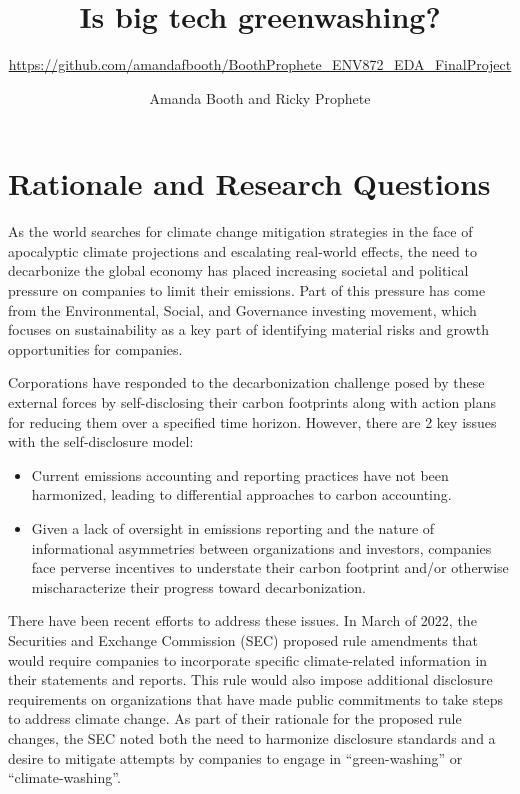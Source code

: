 \documentclass[
  12pt,
]{article}
\title{Is big tech greenwashing?}
\subtitle{\url{https://github.com/amandafbooth/BoothProphete_ENV872_EDA_FinalProject}}
\author{Amanda Booth and Ricky Prophete}
\date{}
\begin{document}
\maketitle

\newpage
\tableofcontents 
\listoftables 
\listoffigures 
\newpage

\hypertarget{rationale-and-research-questions}{%
\section{Rationale and Research
Questions}\label{rationale-and-research-questions}}

As the world searches for climate change mitigation strategies in the
face of apocalyptic climate projections and escalating real-world
effects, the need to decarbonize the global economy has placed
increasing societal and political pressure on companies to limit their
emissions. Part of this pressure has come from the Environmental,
Social, and Governance investing movement, which focuses on
sustainability as a key part of identifying material risks and growth
opportunities for companies.

Corporations have responded to the decarbonization challenge posed by
these external forces by self-disclosing their carbon footprints along
with action plans for reducing them over a specified time horizon.
However, there are 2 key issues with the self-disclosure model:

\begin{itemize}
\item
  Current emissions accounting and reporting practices have not been
  harmonized, leading to differential approaches to carbon accounting.
\item
  Given a lack of oversight in emissions reporting and the nature of
  informational asymmetries between organizations and investors,
  companies face perverse incentives to understate their carbon
  footprint and/or otherwise mischaracterize their progress toward
  decarbonization.
\end{itemize}

There have been recent efforts to address these issues. In March of
2022, the Securities and Exchange Commission (SEC) proposed rule
amendments that would require companies to incorporate specific
climate-related information in their statements and reports. This rule
would also impose additional disclosure requirements on organizations
that have made public commitments to take steps to address climate
change. As part of their rationale for the proposed rule changes, the
SEC noted both the need to harmonize disclosure standards and a desire
to mitigate attempts by companies to engage in ``green-washing'' or
``climate-washing''.
\end{document}
